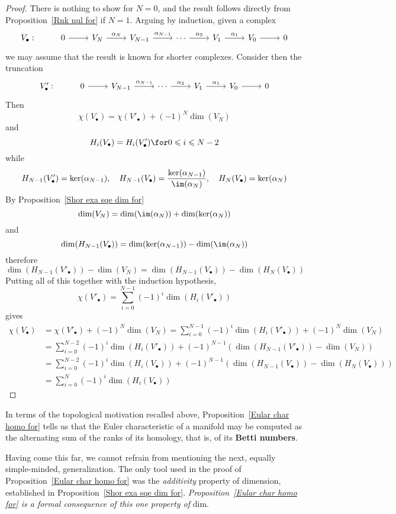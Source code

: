 \begin{proof}
There is nothing to show for $N=0$, and the result follows directly from Proposition~\ref{Rnk nul for} if $N=1$. Arguing by induction, given a complex
\[\begin{tikzcd}
V_{\bullet}:& 0\ar[r]&V_N\ar[r,"\alpha_N"]&V_{N-1}\ar[r,"\alpha_{N-1}"]&\cdots\ar[r,"\alpha_2"]&V_1\ar[r,"\alpha_1"]&V_0\ar[r]&0
\end{tikzcd}\]
we may assume that the result is known for shorter complexes. Consider then the truncation
\[\begin{tikzcd}
V'_{\bullet}:& 0\ar[r]&V_{N-1}\ar[r,"\alpha_{N-1}"]&\cdots\ar[r,"\alpha_2"]&V_1\ar[r,"\alpha_1"]&V_0\ar[r]&0
\end{tikzcd}\]
Then
\[\chi(V_\bullet)=\chi(V'_\bullet)+(-1)^{N}\dim(V_N)\]
and
\[H_i(V_\bullet)=H_i(V'_\bullet)\for 0\leqslant i\leqslant N-2\]
while
\[H_{N-1}(V'_\bullet)=\ker(\alpha_{N-1}),\quad H_{N-1}(V_\bullet)=\dfrac{\ker(\alpha_{N-1})}{\im(\alpha_N)},\quad H_N(V_\bullet)=\ker(\alpha_{N})\]
By Proposition~\ref{Shor exa sqe dim for} 
\[\dim(V_N)=\dim(\im(\alpha_N))+\dim(\ker(\alpha_N))\]
and
\[\dim(H_{N-1}(V_\bullet))=\dim(\ker(\alpha_{N-1}))-\dim(\im(\alpha_N))\]
therefore
\[\dim(H_{N-1}(V'_\bullet))-\dim(V_N)=\dim(H_{N-1}(V_\bullet))-\dim(H_N(V_\bullet))\]
Putting all of this together with the induction hypothesis,
\[\chi(V'_\bullet)=\sum_{i=0}^{N-1}(-1)^i\dim(H_i(V'_\bullet))\]
gives
\begin{align*}
\chi(V_\bullet)&=\chi(V'_\bullet)+(-1)^N\dim(V_N)=\sum_{i=0}^{N-1}(-1)^i\dim(H_i(V'_\bullet))+(-1)^N\dim(V_N)\\
&=\sum_{i=0}^{N-2}(-1)^i\dim(H_i(V'_\bullet))+(-1)^{N-1}(\dim(H_{N-1}(V'_\bullet))-\dim(V_N))\\
&=\sum_{i=0}^{N-2}(-1)^i\dim(H_i(V_\bullet))+(-1)^{N-1}(\dim(H_{N-1}(V_\bullet))-\dim(H_N(V_\bullet)))\\
&=\sum_{i=0}^{N}(-1)^i\dim(H_i(V_\bullet))
\end{align*}
\end{proof}
In terms of the topological motivation recalled above, Proposition~\ref{Eular char homo for} tells us that the Euler characteristic of a manifold may be computed as the alternating sum of the ranks of its homology, that is, of its \textbf{Betti numbers}.\par
Having come this far, we cannot refrain from mentioning the next, equally simple-minded, generalization. The only tool used in the proof of Proposition~\ref{Eular char homo for} was the \textit{additivity} property of dimension, established in Proposition~\ref{Shor exa sqe dim for}. \textit{Proposition~\ref{Eular char homo for} is a formal consequence of this one property of} dim.\par
